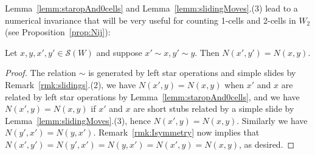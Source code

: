 \documentclass[ALCO,Unicode,published]{cedram}
\newcommand{\sw}{\mathcal{S}(W)}
\begin{document}
Lemma~\ref{lemm:staropAnd0cells} and Lemma~\ref{lemm:slidingMoves}.(3) lead to a numerical invariance that
will be very useful for counting 1-cells and 2-cells in $W_2$ (see Proposition~\ref{prop:Nij}): 

\begin{prop}
    \label{prop:invariance}
    Let $x,y,x',y'\in \sw$ and suppose $x'\sim x, y'\sim y$. Then $N(x',y')=N(x,y)$. 
\end{prop}
\begin{proof}
    The relation $\sim$ is generated by left star operations and simple slides by
    Remark~\ref{rmk:slidings}.(2), we have $N(x',y)=N(x,y)$ when $x'$ and $x$ are related by left star
    operations by Lemma~\ref{lemm:staropAnd0cells}, and we have $N(x',y)=N(x,y)$ if $x'$ and $x$ are
    short stubs related by a simple slide by Lemma~\ref{lemm:slidingMoves}.(3), hence $N(x',y)=N(x,y)$.
    Similarly we have $N(y',x')=N(y,x')$. Remark~\ref{rmk:Isymmetry} now implies that
    $N(x',y')=N(y',x')=N(y,x')=N(x',y)=N(x,y) $, as desired. 
\end{proof}
\end{document}
